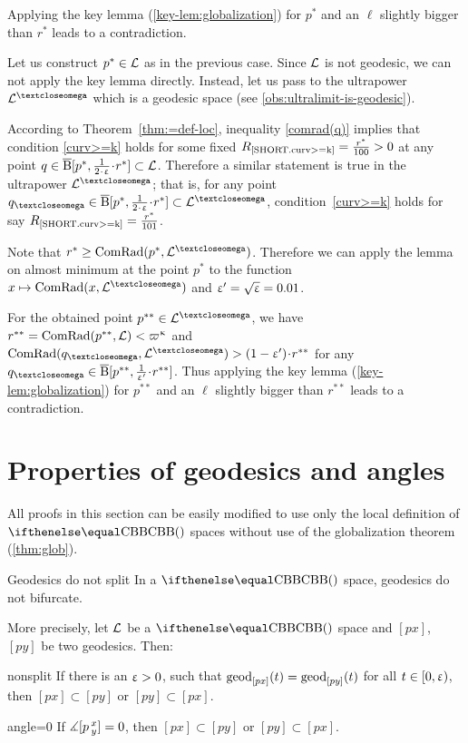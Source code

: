 Applying the key lemma (\ref{key-lem:globalization}) for $p^*$ and  an $\ell$ slightly bigger than $r^*$ leads to a contradiction.

Let us construct $p^*\in\spc{L}$ as in the previous case.
Since $\mathcal{L}$ is not geodesic, we can not apply the key lemma directly.
Instead, let us pass to the ultrapower $\spc{L}^\o$ which
 is a geodesic space (see \ref{obs:ultralimit-is-geodesic}).

According to Theorem~\ref{thm:=def-loc},
inequality \ref{comrad(q)} implies that 
condition  \ref{curv>=k} holds for some fixed $R_{\hbox{\rm\scriptsize\ref{SHORT.curv>=k}}}=\tfrac{r^*}{100}
>0$ at any point $q\in\cBall[p^*,\tfrac1{2\cdot \eps}\cdot r^*]\subset\spc{L}$.
Therefore a similar statement is true in the ultrapower $\spc{L}^\o$;
that is,
for any point
$q_\o\in\cBall[p^*,\tfrac1{2\cdot \eps}\cdot r^*]\subset\spc{L}^\o$, 
condition~\ref{curv>=k} holds for say $R_{\hbox{\rm\scriptsize\ref{SHORT.curv>=k}}}=\tfrac{r^*}{101}$.


Note that $r^*\ge\ComRad(p^*,\spc{L}^\o)$.
Therefore we can apply the lemma on almost minimum 
at the point $p^*$ to the function $x\z\mapsto\ComRad(x,\spc{L}^\o)$
and $\upvarepsilon'=\sqrt{\upvarepsilon}=0.01$.

For the obtained point $p^{{*}{*}}\in \spc{L}^\o$, we have $r^{{*}{*}}\z=\ComRad(p^{{*}{*}},\spc{L})\z<\varpi\kappa$ 
and 
$\ComRad(q_\o,\spc{L}^\o)\z> (1-\eps')\cdot r^{{*}{*}}$ for any $q_\o\in\cBall[p^{{*}{*}},\tfrac{1}{\eps'}\cdot r^{{*}{*}}]$. 
Thus applying the key lemma (\ref{key-lem:globalization}) for $p^{{*}{*}}$ and an $\ell$ slightly bigger than $r^{{*}{*}}$ leads to a contradiction.
\qeds



\section{Properties of geodesics and angles}\label{sec:prop.geod}

All proofs in this section can be easily modified to use only the local definition of $\Alex{}$ spaces without use of the globalization theorem (\ref{thm:glob}).
 
\begin{thm}{Geodesics do not split}\label{thm:g-split}
In a $\Alex{}$ space, geodesics do not bifurcate.

More precisely, let $\mathcal{L}$ be a $\Alex{}$ space and $[p x]$, $[p y]$ be two geodesics. Then:
\begin{subthm}{nonsplit} If  there is an $\upvarepsilon>0$, such that $\mathrm{geod}_{[p x]}(t)=\mathrm{geod}_{[p y]}(t)$ 
for all $t\in[0,\eps)$, 
then $[p x]\subset [p y]$ or $[p y]\subset [p x]$.
\end{subthm}

\begin{subthm}{angle=0}
If $\measuredangle[p\,{}^{x}_{y}]=0$, then $[p x]\subset [p y]$ or $[p y]\subset [p x]$.
\end{subthm}
\end{thm}

